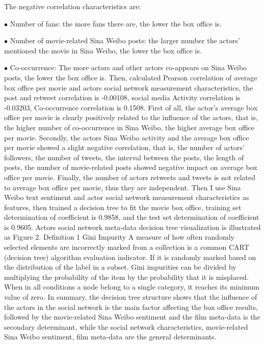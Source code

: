 \documentclass[review]{cvpr}
\begin{document}
The negative correlation characteristics are:
\par$\bullet$ Number of fans: the more fans there are, the lower the box office is.
\par$\bullet$ Number of movie-related Sina Weibo posts: the larger number the actors' mentioned the movie in Sina Weibo, the lower the box office is.
\par$\bullet$ Co-occurrence: The more actors and other actors co-appears on Sina Weibo posts, the lower the box office is.
Then, calculated Pearson correlation of average box office per movie and actors social network measurement characteristics, the post and retweet correlation is -0.00108, social media Activity correlation is -0.03203, Co-occurrence correlation is 0.1508.
First of all, the actor's average box office per movie is clearly positively related to the influence of the actors, that is, the higher number of co-occurrence in Sina Weibo, the higher average box office per movie.
Secondly, the actors Sina Weibo activity and the average box office per movie showed a slight negative correlation, that is, the number of actors' followers, the number of tweets, the interval between the posts, the length of posts, the number of movie-related posts showed negative impact on average box office per movie.
Finally, the number of actors retweets and tweets is not related to average box office per movie, thus they are independent.
Then I use Sina Weibo text sentiment and actor social network measurement characteristics as features, then trained a decision tree to fit the movie box office, training set determination of coefficient is 0.9858, and the test set determination of coefficient is 0.9605.
Actors social network meta-data decision tree visualization is illustrated as Figure 2.
Definition 1 Gini Impurity  A measure of how often randomly selected elements are incorrectly marked from a collection is a common CART (decision tree) algorithm evaluation indicator.
If it is randomly marked based on the distribution of the label in a subset.
Gini impurities can be divided by multiplying the probability of the item by the probability that it is misplaced.
When in all conditions a node belong to a single category, it reaches its minimum value of zero.
In summary, the decision tree structure shows that the influence of the actors in the social network is the main factor affecting the box office results, followed by the movie-related Sina Weibo sentiment and the film meta-data is the secondary determinant,
while the social network characteristics, movie-related Sina Weibo sentiment, film meta-data are the general determinants.
\end{document}
